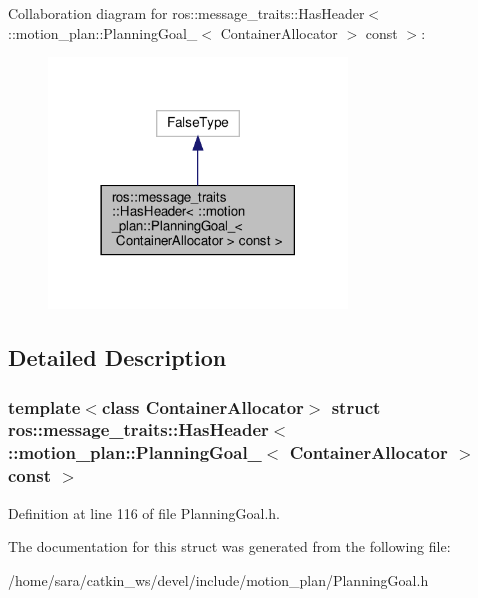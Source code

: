 Collaboration diagram for ros\+:\+:message\+\_\+traits\+:\+:Has\+Header$<$ \+:\+:motion\+\_\+plan\+:\+:Planning\+Goal\+\_\+$<$ Container\+Allocator $>$ const $>$\+:
\nopagebreak
\begin{figure}[H]
\begin{center}
\leavevmode
\includegraphics[width=225pt]{structros_1_1message__traits_1_1HasHeader_3_01_1_1motion__plan_1_1PlanningGoal___3_01ContainerAl782b950df324f62374adf537edca52c4}
\end{center}
\end{figure}


\subsection{Detailed Description}
\subsubsection*{template$<$class Container\+Allocator$>$\newline
struct ros\+::message\+\_\+traits\+::\+Has\+Header$<$ \+::motion\+\_\+plan\+::\+Planning\+Goal\+\_\+$<$ Container\+Allocator $>$ const $>$}



Definition at line 116 of file Planning\+Goal.\+h.



The documentation for this struct was generated from the following file\+:\begin{DoxyCompactItemize}
\item 
/home/sara/catkin\+\_\+ws/devel/include/motion\+\_\+plan/Planning\+Goal.\+h\end{DoxyCompactItemize}
